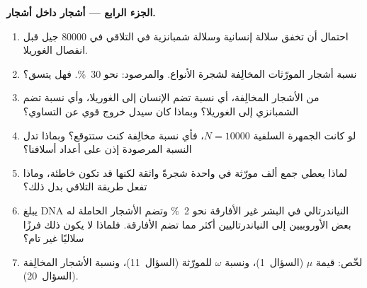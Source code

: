 \begin{problem}
\medskip
\noindent\textbf{الجزء الرابع --- أشجار داخل أشجار.}
\begin{enumerate}[resume]
  \item احتمال أن تخفق سلالة إنسانية وسلالة شمبانزية في
        التلاقي في \num{80000} جيل قبل انفصال الغوريلا.
  \item نسبة أشجار المورّثات المخالِفة لشجرة الأنواع.
        والمرصود: نحو \qty{30}{\%}. فهل يتسق؟
  \item من الأشجار المخالِفة، أي نسبة تضم الإنسان إلى
        الغوريلا، وأي نسبة تضم الشمبانزي إلى الغوريلا؟ وبماذا
        كان سيدل خروج قوي عن التساوي؟
  \item لو كانت الجمهرة السلفية $N = \num{10000}$، فأي نسبة
        مخالِفة كنت ستتوقع؟ وبماذا تدل النسبة المرصودة إذن
        على أعداد أسلافنا؟
  \item لماذا يعطي جمع ألف مورّثة في  واحدة شجرةً واثقة
        لكنها قد تكون خاطئة، وماذا تفعل طريقة التلاقي بدل ذلك؟
  \item يبلغ DNA النياندرتالي في البشر غير الأفارقة نحو
        \qty{2}{\%} وتضم الأشجار الحاملة له بعض الأوروبيين إلى
        النياندرتاليين أكثر مما تضم الأفارقة. فلماذا لا يكون
        ذلك فرزًا سلاليًا غير تام؟
  \item لخّص: قيمة $\mu$ (السؤال~1)، ونسبة $\omega$ للمورّثة
        (السؤال~11)، ونسبة الأشجار المخالِفة (السؤال~20).
\end{enumerate}
\end{problem}
